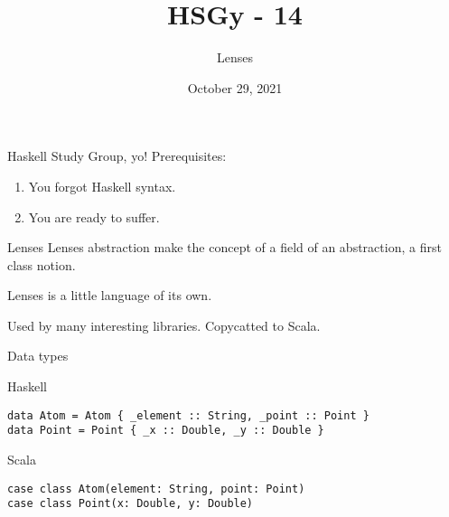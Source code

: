 \documentclass[presentation,aspectratio=169,8pt]{beamer}
\date{October 29, 2021}
\title{HSGy - 14}
\subtitle{Lenses}
\begin{document}
\maketitle
\newcommand{\mathcolorbox}[2]{%
  \begingroup
  \setlength{\fboxsep}{2pt}%
  \colorbox{#1}{$\displaystyle #2$}%
  \endgroup
}


\begin{frame}[label={sec:orge039d3b}]{Haskell Study Group, yo!}
Prerequisites:

\begin{enumerate}
\item You forgot Haskell syntax.
\item You are ready to suffer.
\end{enumerate}
\end{frame}

\begin{frame}[label={sec:org6cb53d4}]{Lenses}
Lenses abstraction make the concept of a field of an abstraction, a first class
notion.

Lenses is a little language of its own.

Used by many interesting libraries. Copycatted to Scala.
\end{frame}

\begin{frame}[label={sec:org24fbdf8},fragile]{Data types}
 \begin{block}{Haskell}
\begin{verbatim}
data Atom = Atom { _element :: String, _point :: Point }
data Point = Point { _x :: Double, _y :: Double }
\end{verbatim}
\end{block}

\begin{block}{Scala}
\begin{verbatim}
case class Atom(element: String, point: Point)
case class Point(x: Double, y: Double)
\end{verbatim}
\end{block}
\end{frame}
\end{document}
